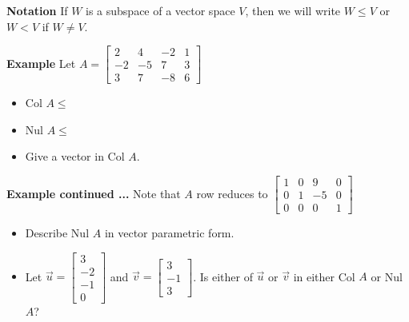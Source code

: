  \begin{frame}[fragile]
\textbf{Notation}
If $W$ is a subspace of a vector space $V$, then we will write $W\le V$ or $W<V$ if $W\neq V$.



\textbf{Example}
Let $\displaystyle A = 
\left[\begin{array}{rrrr}
2 & 4 & -2 & 1 \\
-2 & -5 & 7 & 3 \\
3 & 7 & -8 & 6
\end{array}\right]$
\begin{itemize}
\item Col $A \le $ \textbf{\hspace{1in}} 
\item Nul $A \le $ \textbf{\hspace{1in}}
\item Give a vector in Col $A$.
\end{itemize}

\end{frame}






 \begin{frame}[fragile]
\textbf{Example continued ...}
Note that $A$ row reduces to  
$\displaystyle
\left[\begin{array}{rrrr}
1 & 0 & 9 & 0 \\
0 & 1 & -5 & 0\\
0 & 0 & 0 & 1
\end{array}\right]$
\begin{itemize}
\item Describe Nul $A$ in vector parametric form.
\item Let $\vec{u} = \left[ \begin{array}{rrrr} 3\\-2\\-1\\0 \end{array}\right]$
and $\vec{v} = \left[ \begin{array}{rrrr} 3 \\ -1 \\ 3 \end{array}\right]$.
Is either of $\vec{u}$ or $\vec{v}$ in either Col $A$ or Nul $A$?
\end{itemize}

\end{frame}






